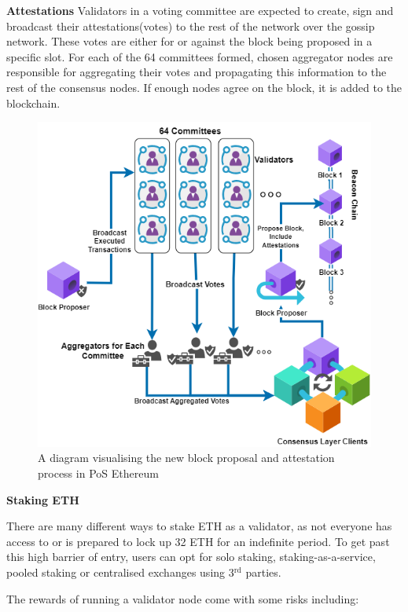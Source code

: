 \textbf{Attestations}
\label{attestationLitRev}
Validators in a voting committee are expected to create, sign and broadcast their attestations(votes) to the rest of the network over the gossip network. These votes are either for or against the block being proposed in a specific slot. For each of the 64 committees formed, chosen aggregator nodes are responsible for aggregating their votes and propagating this information to the rest of the consensus nodes. If enough nodes agree on the block, it is added to the blockchain. 
\begin{figure}[h]
    \centering
    \includegraphics[width=13cm,center]{Figures/AttestationsDiragram.png}
    \caption{A diagram visualising the new block proposal and attestation process in PoS Ethereum}
    \label{Figure:AttestationsDiragram}
\end{figure}
 
\textbf{Staking ETH}

There are many different ways to stake ETH as a validator, as not everyone has access to or is prepared to lock up 32 ETH for an indefinite period. To get past this high barrier of entry, users can opt for solo staking, staking-as-a-service, pooled staking or centralised exchanges using 3$\mathrm{^{rd}}$ parties. 

The rewards of running a validator node come with some risks including:
 
